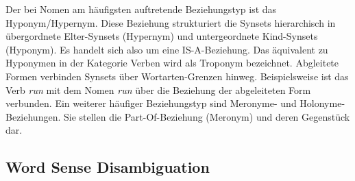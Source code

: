 Der bei Nomen am häufigsten auftretende Beziehungstyp ist das Hyponym/Hypernym. Diese Beziehung strukturiert die Synsets hierarchisch in übergordnete Elter-Synsets (Hypernym) und untergeordnete Kind-Synsets (Hyponym). Es handelt sich also um eine IS-A-Beziehung. Das äquivalent zu Hyponymen in der Kategorie Verben wird als Troponym bezeichnet. Abgleitete Formen verbinden Synsets über Wortarten-Grenzen hinweg. Beispielsweise ist das Verb \textit{run} mit dem Nomen \textit{run} über die Beziehung der abgeleiteten Form verbunden. Ein weiterer häufiger Beziehungstyp sind Meronyme- und Holonyme-Beziehungen. Sie stellen die Part-Of-Beziehung (Meronym) und deren Gegenstück dar.

\par
\subsection{Word Sense Disambiguation}


